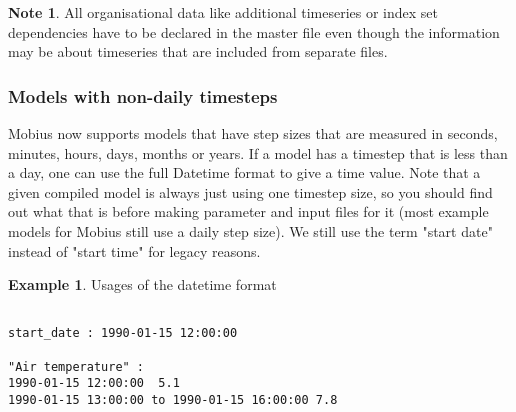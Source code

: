 \documentclass[11pt]{article}
\theoremstyle{definition}
\newtheorem{mynote}{Note}
\newenvironment{note}%
  {\begin{lrbox}{\notebox}%
   \begin{minipage}{\dimexpr\linewidth-2\fboxsep}
   \begin{mynote}}%
  {\end{mynote}%
   \end{minipage}%
   \end{lrbox}%
   \begin{trivlist}
     \item[]\colorbox{silver}{\usebox\notebox}
   \end{trivlist}}
\newtheorem{myexample}{Example}
\newenvironment{example}%
  {\begin{lrbox}{\examplebox}%
   \begin{minipage}{\dimexpr\linewidth-2\fboxsep}
   \begin{myexample}}%
  {\end{myexample}%
   \end{minipage}%
   \end{lrbox}%
   \begin{trivlist}
     \item[]\colorbox{silver}{\usebox\examplebox}
   \end{trivlist}}
\begin{document}
\begin{note}
All organisational data like additional timeseries or index set dependencies have to be declared in the master file even though the information may be about timeseries that are included from separate files.
\end{note}

\subsubsection{Models with non-daily timesteps}

Mobius now supports models that have step sizes that are measured in seconds, minutes, hours, days, months or years. If a model has a timestep that is less than a day, one can use the full Datetime format to give a time value. Note that a given compiled model is always just using one timestep size, so you should find out what that is before making parameter and input files for it (most example models for Mobius still use a daily step size). We still use the term "start date" instead of "start time" for legacy reasons.

\begin{example}
Usages of the datetime format
\begin{lstlisting}

start_date : 1990-01-15 12:00:00

"Air temperature" :
1990-01-15 12:00:00  5.1
1990-01-15 13:00:00 to 1990-01-15 16:00:00 7.8
\end{lstlisting}
\end{example}
\end{document}
